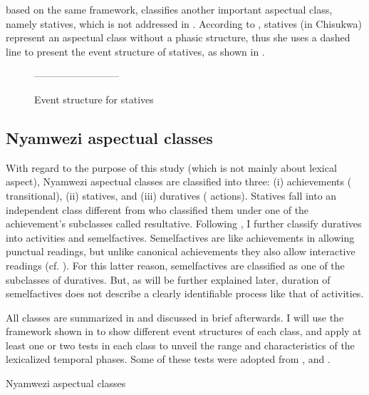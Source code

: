 \documentclass[output=paper]{langscibook}
\begin{document}
\citet[62]{Kershner2002} based on the same framework, classifies another important aspectual class, namely statives, which is not addressed in \citet{Botne2010}. According to \citet{Kershner2002}, statives (in Chisukwa) represent an aspectual class without a phasic structure, thus she uses a dashed line to present the event structure of statives, as shown in . 

\begin{figure}
--------------------------
\label{fig:kanijo:4}
\caption{
Event structure for statives \citep[62]{Kershner2002}
}
\end{figure}
\subsection{Nyamwezi aspectual classes}

With regard to the purpose of this study (which is not mainly about lexical aspect), Nyamwezi aspectual classes are classified into three: (i) achievements ( transitional), (ii) statives, and (iii) duratives ( actions). Statives fall into an independent class different from \citet{Botne2010} who classified them under one of the achievement’s subclasses called resultative. Following \citet{Botne2010}, I further classify duratives into activities and semelfactives. Semelfactives are like achievements in allowing punctual readings, but unlike canonical achievements they also allow interactive readings (cf. \citealt{Kearns2000}). For this latter reason, semelfactives are classified as one of the subclasses of duratives. But, as will be further explained later, duration of semelfactives does not describe a clearly identifiable process like that of activities. 

All classes are summarized in  and discussed in brief afterwards. I will use the framework shown in  to show different event structures of each class, and apply at least one or two tests in each class to unveil the range and characteristics of the lexicalized temporal phases. Some of these tests were adopted from \citet{Kershner2002}, \citet{Crane2016} and \citet{Persohn2017b}.

\ea \label{ex:kanijo:8}
 Nyamwezi aspectual classes

\z
\end{document}

